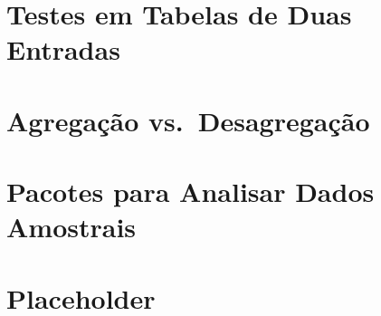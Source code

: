 \documentclass[]{book}
\begin{document}
\chapter{Testes em Tabelas de Duas
Entradas}\label{testes-em-tabelas-de-duas-entradas}

\chapter{Agregação vs.~Desagregação}\label{agregacao-vs.desagregacao}

\chapter{Pacotes para Analisar Dados
Amostrais}\label{pacotes-para-analisar-dados-amostrais}

\chapter{Placeholder}\label{placeholder}


\end{document}
